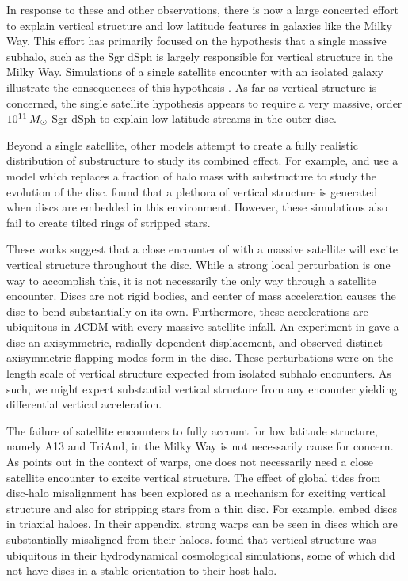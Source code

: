 %
In response to these and other observations, there is now a large concerted effort to explain vertical structure and low latitude features in galaxies like the Milky Way. This effort has primarily focused on the hypothesis that a single massive subhalo, such as the Sgr dSph \citep{ibata_discovery} is largely responsible for vertical structure in the Milky Way. Simulations of a single satellite encounter with an isolated galaxy illustrate the consequences of this hypothesis \citep[for example]{purcell2011,gomez_2013,widrow_2014,feldmann_2015, dlv_2015, donghia_2016, laporte_2016, laporte_2018, laporte_2018_b}. As far as vertical structure is concerned, the single satellite hypothesis appears to require a very massive, order $10^{11}\,M_\odot$ Sgr dSph to explain low latitude streams in the outer disc. 

Beyond a single satellite, other models attempt to create a fully realistic distribution of substructure to study its combined effect. For example, \citet{gauthier_2006} and \citet{chequers_2018} use a model which replaces a fraction of halo mass with substructure to study the evolution of the disc. \citet{chequers_2018} found that a plethora of vertical structure is generated when discs are embedded in this environment. However, these simulations also fail to create tilted rings of stripped stars.


These works suggest that a close encounter of with a massive satellite will excite vertical structure throughout the disc. While a strong local perturbation is one way to accomplish this, it is not necessarily the only way through a satellite encounter. Discs are not rigid bodies, and center of mass acceleration causes the disc to bend substantially on its own. Furthermore, these accelerations are ubiquitous in $\Lambda$CDM with every massive satellite infall. An experiment in \citet{sellwood_1996} gave a disc an axisymmetric, radially dependent displacement, and observed distinct axisymmetric flapping modes form in the disc. These perturbations were on the length scale of vertical structure expected from isolated subhalo encounters. As such, we might expect substantial vertical structure from any encounter yielding differential vertical acceleration.


The failure of satellite encounters to fully account for low latitude structure, namely A13 and TriAnd, in the Milky Way is not necessarily cause for concern. As \citet{binney_1992} points out in the context of warps, one does not necessarily need a close satellite encounter to excite vertical structure. The effect of global tides from disc-halo misalignment has been explored as a mechanism for exciting vertical structure and also for stripping stars from a thin disc. For example, \citet{hu_2016} embed discs in triaxial haloes. In their appendix, strong warps can be seen in discs which are substantially misaligned from their haloes. \citet{gomez_2017} found that vertical structure was ubiquitous in their hydrodynamical cosmological simulations, some of which did not have discs in a stable orientation to their host halo.

